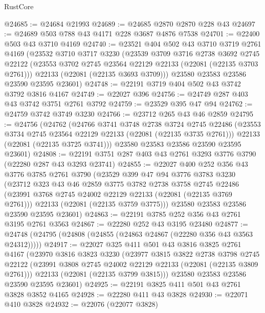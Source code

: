 \begin{lexlean}{RustCore}
\begin{coremodule}
@24685 := @24684 @21993
@24689 := @24685 @2870 @2870 @228 @43
@24697 := @24689 @503 @788 @43 @4171 @228 @3687 @4876 @7538
@24701 := @22400 @503 @43 @3710 @4169
@24740 := @23521
    @404
    @502
    @43
    @3710
    @3719
    @2761
    @4169
    (@23532
      @3710
      @3717
      @3230
      (@23539
        @3709
        @3716
        @2738
        @3692
        @2745
        @22122
        (@23553 @3702 @2745 @23564 @22129 @22133 (@22081 (@22135 @3703 @2761)))
        @22133
        (@22081 (@22135 @3693 @3709)))
      @23580
      @23583
      @23586
      @23590
      @23595
      @23601)
@24748 := @22191 @3719 @404 @502 @43 @3742 @3792 @3816 @4167
@24749 := @22027 @396
@24756 := @24749 @287 @403 @43 @3742 @3751 @2761 @3792
@24759 := @23529 @395 @47 @94
@24762 := @24759 @3742 @3749 @3230
@24766 := @23712 @265 @43 @46 @2859
@24795 := @24756
    (@24762
      (@24766
        @3741
        @3748
        @2738
        @3724
        @2745
        @22486
        (@23553 @3734 @2745 @23564 @22129 @22133 (@22081 (@22135 @3735 @2761)))
        @22133
        (@22081 (@22135 @3725 @3741)))
      @23580
      @23583
      @23586
      @23590
      @23595
      @23601)
@24808 := @22191 @3751 @287 @403 @43 @2761 @3293 @3776 @3790 (@22280 @287 @43 @3293 @23741)
@24855 := @22027
    @400
    @252
    @356
    @43
    @3776
    @3785
    @2761
    @3790
    (@23529
      @399
      @47
      @94
      @3776
      @3783
      @3230
      (@23712
        @323
        @43
        @46
        @2859
        @3775
        @3782
        @2738
        @3758
        @2745
        @22486
        (@23991 @3768 @2745 @24002 @22129 @22133 (@22081 (@22135 @3769 @2761)))
        @22133
        (@22081 (@22135 @3759 @3775)))
      @23580
      @23583
      @23586
      @23590
      @23595
      @23601)
@24863 := @22191 @3785 @252 @356 @43 @2761 @3195 @2761 @3563
@24867 := @22280 @252 @43 @3195 @23480
@24877 := @24748 (@24795 (@24808 (@24855 (@24863 @24867 (@22280 @356 @43 @3563 @24312)))))
@24917 := @22027
    @325
    @411
    @501
    @43
    @3816
    @3825
    @2761
    @4167
    (@23970
      @3816
      @3823
      @3230
      (@23977
        @3815
        @3822
        @2738
        @3798
        @2745
        @22122
        (@23991 @3808 @2745 @24002 @22129 @22133 (@22081 (@22135 @3809 @2761)))
        @22133
        (@22081 (@22135 @3799 @3815)))
      @23580
      @23583
      @23586
      @23590
      @23595
      @23601)
@24925 := @22191 @3825 @411 @501 @43 @2761 @3828 @3852 @4165
@24928 := @22280 @411 @43 @3828
@24930 := @22071 @410 @3828
@24932 := @22076 (@22077 @3828)

\end{coremodule}
\end{lexlean}
